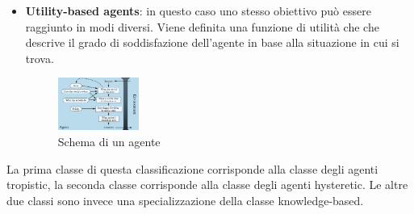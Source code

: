 \begin{itemize}
\begin{figure}[!ht]
              \label{fig:GoalBased}
          \end{figure}
    \item \textbf{Utility-based agents}: in questo caso uno stesso obiettivo può
          essere raggiunto in modi diversi. Viene definita una funzione di utilità che
          che descrive il grado di soddisfazione dell'agente in base alla situazione
          in cui si trova.
          \begin{figure}[!ht]
              \centering
              \includegraphics[width=0.25\textwidth]{./img/Agenti/UtilityBasedAgent.png}
              \caption{Schema di un agente}
              \label{fig:UtilityBased}
          \end{figure}
\end{itemize}

La prima classe di questa classificazione corrisponde alla classe degli agenti
tropistic, la seconda classe corrisponde alla classe degli agenti hysteretic. Le
altre due classi sono invece una specializzazione della classe knowledge-based.